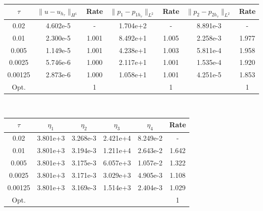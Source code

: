 \begin{center} 
\centering
\small
\begin{tabular}{c|c|c|c|c|c|c}
$\tau$ & $\|u-u_{h_{\tau}}\|_{H^1}$ & Rate & $\|p_1-p_{1h_{\tau}}\|_{L^2}$ & Rate & $\|p_2-p_{2h_{\tau}}\|_{L^2}$ & Rate \\\hline
0.02   	& 4.602e-5 & -     & 1.704e+2 & -     & 8.891e-3 &  -    \\
0.01   	& 2.300e-5 & 1.001 & 8.492e+1 & 1.005 & 2.258e-3 & 1.977 \\
0.005  	& 1.149e-5 & 1.001 & 4.238e+1 & 1.003 & 5.811e-4 & 1.958 \\
0.0025  & 5.746e-6 & 1.000 & 2.117e+1 & 1.001 & 1.535e-4 & 1.920 \\
0.00125 & 2.873e-6 & 1.000 & 1.058e+1 & 1.001 & 4.251e-5 & 1.853 \\ \hline
Opt. & & 1 & & 1  & & 1
\end{tabular}
\normalsize
{} \label{tab:bb_bio_time_error}
\end{center}
\mbox{} \\
\begin{center} 
\centering
\begin{tabular}{c|c|c|c|c|c}
$\tau$ & $\eta_1$ & $\eta_2$ & $\eta_3$ & $\eta_4$ & Rate\\\hline
0.02    & 3.801e+3 & 3.268e-3 & 2.421e+4 & 8.249e-2 & -    \\
0.01    & 3.801e+3 & 3.194e-3 & 1.211e+4 & 2.643e-2 & 1.642\\
0.005   & 3.801e+3 & 3.175e-3 & 6.057e+3 & 1.057e-2 & 1.322\\
0.0025  & 3.801e+3 & 3.171e-3 & 3.029e+3 & 4.905e-3 & 1.108\\
0.00125 & 3.801e+3 & 3.169e-3 & 1.514e+3 & 2.404e-3 & 1.029\\\hline
Opt. & & & & & 1
\end{tabular}
 \label{tab:bb_bio_time_est}
\end{center}

